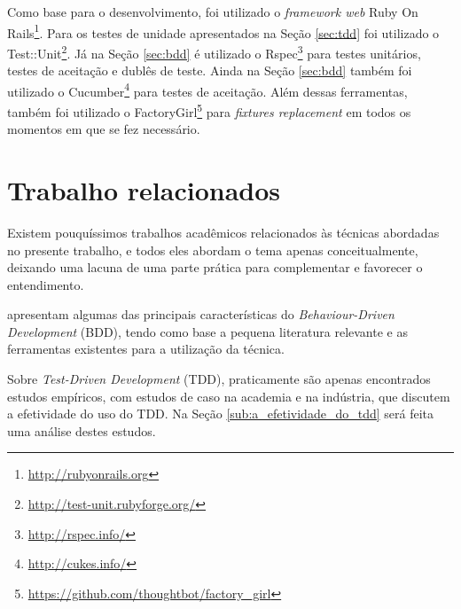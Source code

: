 Como base para o desenvolvimento, foi utilizado o \textit{framework web} Ruby On Rails\footnote{\url{http://rubyonrails.org}}. Para os testes de unidade apresentados na Seção \ref{sec:tdd} foi utilizado o Test::Unit\footnote{\url{http://test-unit.rubyforge.org/}}. Já na Seção \ref{sec:bdd} é utilizado o Rspec\footnote{\url{http://rspec.info/}} para testes unitários, testes de aceitação e dublês de teste. Ainda na Seção \ref{sec:bdd} também foi utilizado o Cucumber\footnote{\url{http://cukes.info/}} para testes de aceitação. Além dessas ferramentas, também foi utilizado o FactoryGirl\footnote{\url{https://github.com/thoughtbot/factory_girl}} para \textit{fixtures replacement} em todos os momentos em que se fez necessário.

\section{Trabalho relacionados} %
\label{sec:trabalho_relacionados}

Existem pouquíssimos trabalhos acadêmicos relacionados às técnicas abordadas no presente trabalho, e todos eles abordam o tema apenas conceitualmente, deixando uma lacuna de uma parte prática para complementar e favorecer o entendimento.

 apresentam algumas das principais características do \textit{Behaviour-Driven Development} (BDD), tendo como base a pequena literatura relevante e as ferramentas existentes para a utilização da técnica.

Sobre \textit{Test-Driven Development} (TDD), praticamente são apenas encontrados estudos empíricos, com estudos de caso na academia e na indústria, que discutem a efetividade do uso do TDD. Na Seção \ref{sub:a_efetividade_do_tdd} será feita uma análise destes estudos.

